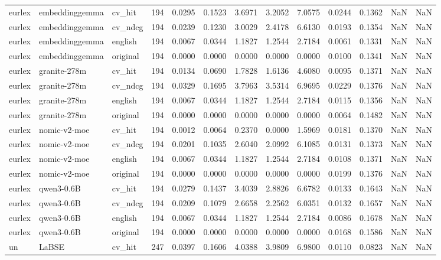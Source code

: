 \begin{tabular}{lllrrrrrrrrrr}
eurlex & embeddinggemma & cv\_hit & 194 & 0.0295 & 0.1523 & 3.6971 & 3.2052 & 7.0575 & 0.0244 & 0.1362 & NaN & NaN \\
eurlex & embeddinggemma & cv\_ndcg & 194 & 0.0239 & 0.1230 & 3.0029 & 2.4178 & 6.6130 & 0.0193 & 0.1354 & NaN & NaN \\
eurlex & embeddinggemma & english & 194 & 0.0067 & 0.0344 & 1.1827 & 1.2544 & 2.7184 & 0.0061 & 0.1331 & NaN & NaN \\
eurlex & embeddinggemma & original & 194 & 0.0000 & 0.0000 & 0.0000 & 0.0000 & 0.0000 & 0.0100 & 0.1341 & NaN & NaN \\
eurlex & granite-278m & cv\_hit & 194 & 0.0134 & 0.0690 & 1.7828 & 1.6136 & 4.6080 & 0.0095 & 0.1371 & NaN & NaN \\
eurlex & granite-278m & cv\_ndcg & 194 & 0.0329 & 0.1695 & 3.7963 & 3.5314 & 6.9695 & 0.0229 & 0.1376 & NaN & NaN \\
eurlex & granite-278m & english & 194 & 0.0067 & 0.0344 & 1.1827 & 1.2544 & 2.7184 & 0.0115 & 0.1356 & NaN & NaN \\
eurlex & granite-278m & original & 194 & 0.0000 & 0.0000 & 0.0000 & 0.0000 & 0.0000 & 0.0064 & 0.1482 & NaN & NaN \\
eurlex & nomic-v2-moe & cv\_hit & 194 & 0.0012 & 0.0064 & 0.2370 & 0.0000 & 1.5969 & 0.0181 & 0.1370 & NaN & NaN \\
eurlex & nomic-v2-moe & cv\_ndcg & 194 & 0.0201 & 0.1035 & 2.6040 & 2.0992 & 6.1085 & 0.0131 & 0.1373 & NaN & NaN \\
eurlex & nomic-v2-moe & english & 194 & 0.0067 & 0.0344 & 1.1827 & 1.2544 & 2.7184 & 0.0108 & 0.1371 & NaN & NaN \\
eurlex & nomic-v2-moe & original & 194 & 0.0000 & 0.0000 & 0.0000 & 0.0000 & 0.0000 & 0.0199 & 0.1376 & NaN & NaN \\
eurlex & qwen3-0.6B & cv\_hit & 194 & 0.0279 & 0.1437 & 3.4039 & 2.8826 & 6.6782 & 0.0133 & 0.1643 & NaN & NaN \\
eurlex & qwen3-0.6B & cv\_ndcg & 194 & 0.0209 & 0.1079 & 2.6658 & 2.2562 & 6.0351 & 0.0132 & 0.1657 & NaN & NaN \\
eurlex & qwen3-0.6B & english & 194 & 0.0067 & 0.0344 & 1.1827 & 1.2544 & 2.7184 & 0.0086 & 0.1678 & NaN & NaN \\
eurlex & qwen3-0.6B & original & 194 & 0.0000 & 0.0000 & 0.0000 & 0.0000 & 0.0000 & 0.0168 & 0.1586 & NaN & NaN \\
un & LaBSE & cv\_hit & 247 & 0.0397 & 0.1606 & 4.0388 & 3.9809 & 6.9800 & 0.0110 & 0.0823 & NaN & NaN \\

\end{tabular}
